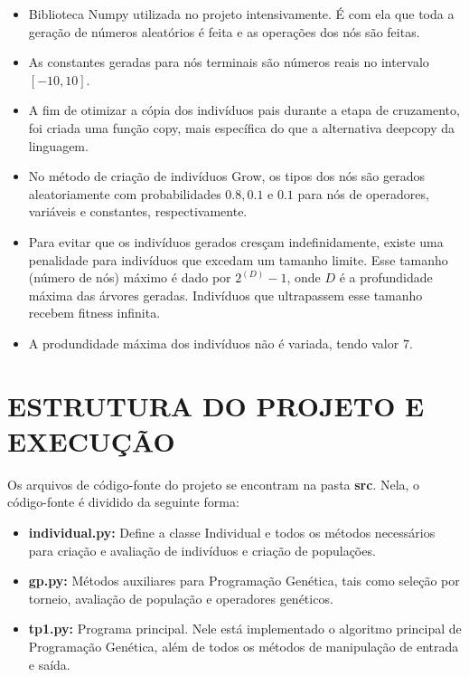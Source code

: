 \documentclass[12pt]{article}
\begin{document}
\begin{itemize}
 \item Biblioteca Numpy utilizada no projeto intensivamente. É com ela que toda a geração
 de números aleatórios é feita e as operações dos nós são feitas.
 
 \item As constantes geradas para nós terminais são números reais no intervalo
 $ [-10, 10] $.
 
 \item A fim de otimizar a cópia dos indivíduos pais durante a etapa de cruzamento,
 foi criada uma função copy, mais específica do que a alternativa deepcopy da linguagem.
 
 \item No método de criação de indivíduos Grow, os tipos dos nós são gerados aleatoriamente
 com probabilidades $ 0.8, 0.1 $ e $ 0.1 $ para nós de operadores, variáveis e constantes,
 respectivamente.
 
 \item Para evitar que os indivíduos gerados cresçam indefinidamente, existe uma penalidade
 para indivíduos que excedam um tamanho limite. Esse tamanho (número de nós) máximo é dado
 por $ 2^(D) - 1 $, onde $ D $ é a profundidade máxima das árvores geradas. Indivíduos que
 ultrapassem esse tamanho recebem fitness infinita.
 
 \item A produndidade máxima dos indivíduos não é variada, tendo valor $ 7 $.
\end{itemize}


\section{ESTRUTURA DO PROJETO E EXECUÇÃO}

Os arquivos de código-fonte do projeto se encontram na pasta \textbf{src}. Nela, o
código-fonte é dividido da seguinte forma:

\begin{itemize}
 \item \textbf{individual.py:} Define a classe Individual e todos os métodos necessários
 para criação e avaliação de indivíduos e criação de populações.
 
 \item \textbf{gp.py:} Métodos auxiliares para Programação Genética, tais como seleção
 por torneio, avaliação de população e operadores genéticos.
 
 \item \textbf{tp1.py:} Programa principal. Nele está implementado o algoritmo principal
 de Programação Genética, além de todos os métodos de manipulação de entrada e saída.
\end{itemize}
\end{document}

